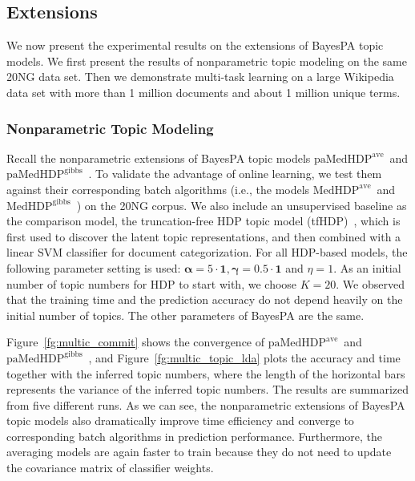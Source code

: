 \documentclass[twoside,11pt]{article}
\newcommand{\alphav}{\bm \alpha}
\newcommand{\gammav}{\bm \gamma}
\newcommand\paMedHDPave{$\text{paMedHDP}^{\text{ave}}$~}
\newcommand\paMedHDPgibbs{$\text{paMedHDP}^{\text{gibbs}}$~}
\newcommand\MedHDPave{$\text{MedHDP}^{\text{ave}}$~}
\newcommand\MedHDPgibbs{$\text{MedHDP}^{\text{gibbs}}$~}
\newcommand{\strin}[1]{\todo[size=\small, color=green!40]{\bf\sf  #1}}
\newcommand{\jun}[1]{\marginpar{\color{blue}\tiny{Jun: #1}}}
\begin{document}
\subsection{Extensions}

We now present the experimental results on the extensions of BayesPA topic models. We first present the results of nonparametric topic modeling on the same 20NG data set. Then we demonstrate multi-task learning on a large Wikipedia data set with more than 1 million documents and about 1 million unique terms.





\subsubsection{Nonparametric Topic Modeling}

Recall the nonparametric extensions of BayesPA topic models \paMedHDPave and \paMedHDPgibbs. To validate the advantage of online learning, we test them against their corresponding batch algorithms (i.e., the models \MedHDPave and \MedHDPgibbs) on the 20NG corpus. We also include an unsupervised baseline as the comparison model, the truncation-free HDP topic model (tfHDP)~\citep{wang2012truncation}, which is first used to discover the latent topic representations, and then combined with a linear SVM classifier for document categorization. For all HDP-based models, the following parameter setting is used: $\alphav = 5 \cdot \bm{1}, \gammav = 0.5 \cdot \bm{1}$ and $\eta = 1$. As an initial number of topic numbers for HDP to start with, we choose $K = 20$. We observed that the training time and the prediction accuracy do not depend heavily on the initial number of topics. The other parameters of BayesPA are the same.


Figure~\ref{fg:multic_commit} shows the convergence of \paMedHDPave and \paMedHDPgibbs, and Figure~\ref{fg:multic_topic_lda} plots the accuracy and time together with the inferred topic numbers, where the length of the horizontal bars represents the variance of the inferred topic numbers. The results are summarized from five different runs. As we can see, the nonparametric extensions of BayesPA topic models also dramatically improve time efficiency and converge to corresponding batch algorithms  in prediction performance. Furthermore, the averaging models are again faster to train because they do not need to update the covariance matrix of classifier weights.
\end{document}

